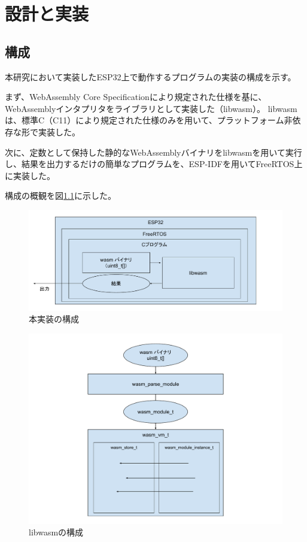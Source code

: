 \chapter{設計と実装}
\label{chap:implementation}

\section{構成}

本研究において実装したESP32上で動作するプログラムの実装の構成を示す。

まず、WebAssembly Core Specification\cite{wasm_spec}により規定された仕様を基に、WebAssemblyインタプリタをライブラリとして実装した（libwasm）。
libwasmは、標準C（C11）により規定された仕様のみを用いて、プラットフォーム非依存な形で実装した。

次に、定数として保持した静的なWebAssemblyバイナリをlibwasmを用いて実行し、結果を出力するだけの簡単なプログラムを、ESP-IDF\cite{esp_idf}を用いてFreeRTOS上に実装した。

構成の概観を図\ref{fig:esp32_libwasm}に示した。

\begin{figure}[htbp]
  \caption{本実装の構成}
  \label{fig:esp32_libwasm}
  \begin{center}
    \includegraphics[bb=0 0 800 300,width=12cm]{img/esp32_libwasm.pdf}
  \end{center}
\end{figure}

\begin{figure}[htbp]
  \caption{libwasmの構成}
  \label{fig:libwasm_arch}
  \begin{center}
    \includegraphics[bb=0 0 800 600,width=12cm]{img/libwasm_arch.pdf}
  \end{center}
\end{figure}
